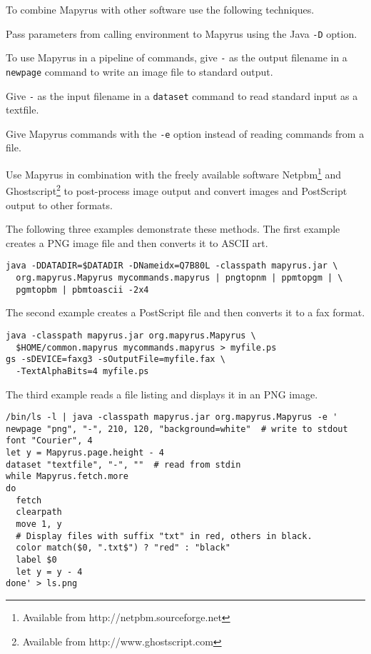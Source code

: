 To combine Mapyrus with other software use the following
techniques.

Pass parameters from calling environment to Mapyrus using the Java
\texttt{-D} option.

To use Mapyrus in a pipeline of commands,
give \texttt{-} as the output filename in a
\texttt{newpage}
command to write an image file to standard output.

Give \texttt{-} as the input filename in a
\texttt{dataset}
command to read standard input as a textfile.

Give Mapyrus commands with the \texttt{-e} option
instead of reading commands from a file.

Use Mapyrus in combination with the freely available software
Netpbm\footnote{Available from http://netpbm.sourceforge.net} and
Ghostscript\footnote{Available from http://www.ghostscript.com} to post-process
image output and convert images and PostScript output to other formats.

The following three examples demonstrate these methods.
The first example creates a PNG image file and then converts it to ASCII art.

\begin{verbatim}
java -DDATADIR=$DATADIR -DNameidx=Q7B80L -classpath mapyrus.jar \
  org.mapyrus.Mapyrus mycommands.mapyrus | pngtopnm | ppmtopgm | \
  pgmtopbm | pbmtoascii -2x4
\end{verbatim}

The second example creates a PostScript file and then converts it
to a fax format.

\begin{verbatim}
java -classpath mapyrus.jar org.mapyrus.Mapyrus \
  $HOME/common.mapyrus mycommands.mapyrus > myfile.ps
gs -sDEVICE=faxg3 -sOutputFile=myfile.fax \
  -TextAlphaBits=4 myfile.ps
\end{verbatim}

The third example reads a file listing and displays it in an
PNG image.

\begin{verbatim}
/bin/ls -l | java -classpath mapyrus.jar org.mapyrus.Mapyrus -e '
newpage "png", "-", 210, 120, "background=white"  # write to stdout
font "Courier", 4
let y = Mapyrus.page.height - 4
dataset "textfile", "-", ""  # read from stdin
while Mapyrus.fetch.more
do
  fetch 
  clearpath
  move 1, y
  # Display files with suffix "txt" in red, others in black.
  color match($0, ".txt$") ? "red" : "black"
  label $0
  let y = y - 4
done' > ls.png
\end{verbatim}

